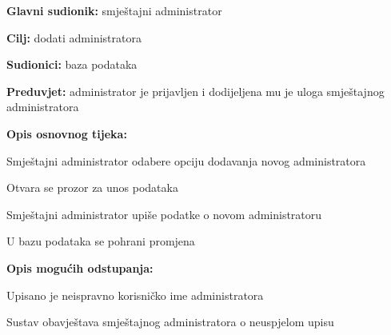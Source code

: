                         \noindent {}
					\begin{packed_item}
	
						\item \textbf{Glavni sudionik: }smještajni administrator
						\item  \textbf{Cilj:} dodati administratora
						\item  \textbf{Sudionici:} baza podataka
						\item  \textbf{Preduvjet:} administrator je prijavljen i dodijeljena mu je uloga smještajnog administratora
						\item  \textbf{Opis osnovnog tijeka:}
						
						\item[] \begin{packed_enum}
	
							\item Smještajni administrator odabere opciju dodavanja novog administratora
							\item Otvara se prozor za unos podataka
							\item Smještajni administrator upiše podatke o novom administratoru
							\item U bazu podataka se pohrani promjena
							
						\end{packed_enum}
						
						\item  \textbf{Opis mogućih odstupanja:}
						
						\item[] \begin{packed_item}
	
							\item[3.a] Upisano je neispravno korisničko ime administratora
							\item[] \begin{packed_enum}
								
								\item Sustav obavještava smještajnog administratora o neuspjelom upisu
								
							\end{packed_enum}
					
						\end{packed_item}
					\end{packed_item}

